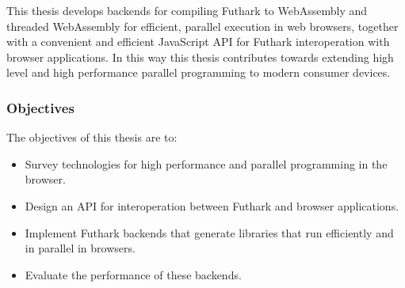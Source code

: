\documentclass[11pt]{book}
\begin{document}



This thesis develops backends for compiling Futhark to WebAssembly and threaded WebAssembly for efficient, parallel execution in web browsers, together with a convenient and efficient JavaScript API for Futhark interoperation with browser applications. In this way this thesis contributes towards extending high level and high performance parallel programming to modern consumer devices.

\subsubsection*{Objectives}
The objectives of this thesis are to:
\begin{itemize}


\item Survey technologies for high performance and parallel programming in the browser.

\item Design an API for interoperation between Futhark and browser applications.




\item Implement Futhark backends that generate libraries that run efficiently and in parallel in browsers.

\item Evaluate the performance of these backends. 

\end{itemize}




\end{document}
